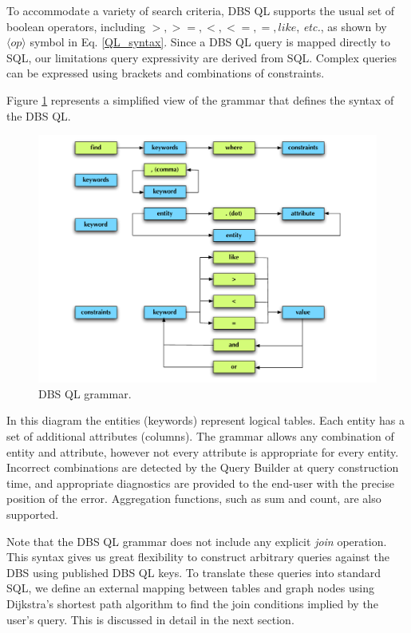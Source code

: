 \documentclass[a4paper]{jpconf}
\begin{document}
To accommodate a variety of search criteria, DBS QL supports
the usual set of boolean operators, including $>, >=, <, <=, =, like$, {\it etc.},
as shown by $\langle op\rangle$ symbol in Eq. \ref{QL_syntax}.
Since a DBS QL query is mapped directly to SQL, our limitations query expressivity
are derived from SQL.  Complex queries can be expressed using
brackets and combinations of constraints.

Figure \ref{Grammar} represents a simplified view of the grammar
that defines the syntax of the DBS QL.
\begin{figure}[htb]
\centering
\includegraphics[width=150mm]{DBSSql_grammar.pdf}
\caption{
DBS QL grammar.
}
\label{Grammar}
\end{figure}
In this diagram the entities (keywords) represent logical tables. 
Each entity has a set of additional attributes (columns). 
The grammar allows any combination of entity and
attribute, however not every attribute
is appropriate for every entity.  Incorrect
combinations are detected by the Query Builder at query construction time,
and appropriate diagnostics are provided to the end-user with the
precise position of the error.  Aggregation functions, such
as sum and count, are also supported.

Note that the DBS QL grammar does not
include any explicit {\it join} operation.
This syntax gives us great flexibility to construct
arbitrary queries against the DBS using published DBS QL keys.
To translate these queries into standard SQL, we define an external mapping between
tables and graph nodes using
Dijkstra’s shortest path algorithm to find the join conditions
implied by the user's query.  This is discussed in detail in the next section.
\end{document}
